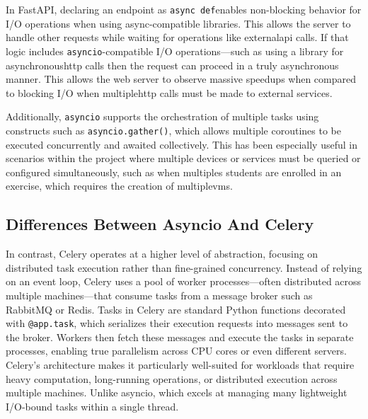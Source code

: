     In FastAPI, declaring an endpoint as \texttt{async def}enables non-blocking behavior for I/O operations when using 
    async-compatible libraries. This allows the server to handle other requests while waiting for operations like 
    external\ac{api} calls. If that logic includes \texttt{asyncio}-compatible I/O operations—such as using a 
    library for asynchronous\ac{http} calls then the request can proceed in a truly asynchronous manner. This 
    allows the web server to observe massive speedups when compared to blocking I/O when multiple\ac{http} calls 
    must be made to external services.

    Additionally, \texttt{asyncio} supports the orchestration of multiple tasks using constructs such as \texttt{asyncio.gather()}, 
    which allows multiple coroutines to be executed concurrently and awaited collectively. This has been especially useful in 
    scenarios within the project where multiple devices or services must be queried or configured simultaneously, such as 
    when multiples students are enrolled in an exercise, which requires the creation of multiple\ac{vm}s.

    \subsection{Differences Between Asyncio And Celery}

        In contrast, Celery operates at a higher level of abstraction, focusing on distributed task execution rather 
        than fine-grained concurrency. Instead of relying on an event loop, Celery uses a pool of worker 
        processes—often distributed across multiple machines—that consume tasks from a message broker such as RabbitMQ 
        or Redis. Tasks in Celery are standard Python functions decorated with \texttt{@app.task}, which serializes their 
        execution requests into messages sent to the broker. Workers then fetch these messages and execute the tasks 
        in separate processes, enabling true parallelism across CPU cores or even different servers. Celery's 
        architecture makes it particularly well-suited for workloads that require heavy computation, long-running 
        operations, or distributed execution across multiple machines. Unlike asyncio, which excels at managing many 
        lightweight I/O-bound tasks within a single thread.

